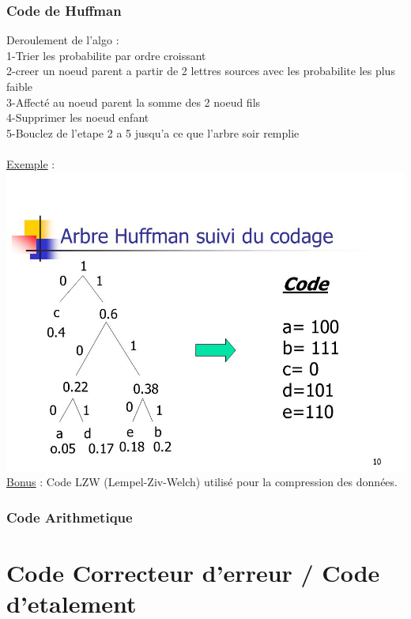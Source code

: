 \documentclass[a4paper,8pt,openany]{book}
\begin{document}
\subsection{Code de Huffman}
Deroulement de l'algo :\\
1-Trier les probabilite par ordre croissant\\
2-creer un noeud parent a partir de 2 lettres sources avec les probabilite les plus faible\\
3-Affect\'e au noeud parent la somme des 2 noeud fils\\
4-Supprimer les noeud enfant\\
5-Bouclez de l'etape 2 a 5 jusqu'a ce que l'arbre soir remplie\\
\\
\underline{Exemple} : \\
\includegraphics[width=1\linewidth]{img/code_de_huffman.jpg}
\\

\underline{Bonus} : Code LZW (Lempel-Ziv-Welch) utilis\'e  pour la compression des donn\'ees.\\

\subsection{Code Arithmetique}




\chapter{Code Correcteur d'erreur / Code d'etalement}
\end{document}
